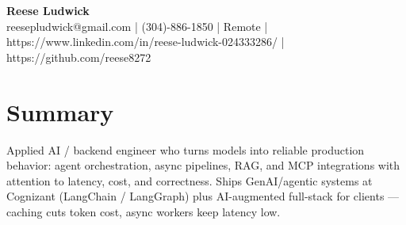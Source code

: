 \documentclass[10pt]{article}
\begin{document}
\begin{center}
{\fontsize{14}{16}\selectfont\bfseries Reese Ludwick}\\[1pt]
{\fontsize{9}{11}\selectfont reesepludwick@gmail.com | (304)-886-1850 | Remote | https://www.linkedin.com/in/reese-ludwick-024333286/ | https://github.com/reese8272}
\end{center}
\vspace{-2pt}
\section*{Summary}
\noindent Applied AI / backend engineer who turns models into reliable production behavior: agent orchestration, async pipelines, RAG, and MCP integrations with attention to latency, cost, and correctness. Ships GenAI/agentic systems at Cognizant (LangChain / LangGraph) plus AI-augmented full-stack for clients — caching cuts token cost, async workers keep latency low.\par
\end{document}
